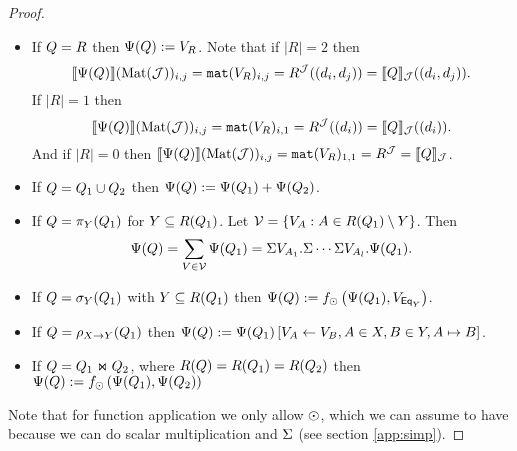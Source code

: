 \begin{proof}
\begin{itemize}
  \item If $Q = R$ then $\Psi (Q):=V_R$. Note that if $|R|=2$ then 
    $$\llbracket \Psi(Q) \rrbracket(\text{Mat}(\mathcal{J}))_{i,j}=\texttt{mat}(V_R)_{i,j} = R^{\mathcal{J}}((d_i, d_j))=\llbracket Q \rrbracket_{\mathcal{J}}((d_i, d_j)).$$ 
    If $|R|=1$ then 
    $$\llbracket \Psi(Q) \rrbracket(\text{Mat}(\mathcal{J}))_{i,j}=\texttt{mat}(V_R)_{i,1} = R^{\mathcal{J}}((d_i))=\llbracket Q \rrbracket_{\mathcal{J}}((d_i)).$$
    And if $|R|=0$ then 
    $\llbracket \Psi(Q) \rrbracket(\text{Mat}(\mathcal{J}))_{i,j}=\texttt{mat}(V_R)_{1,1} = R^{\mathcal{J}}=\llbracket Q \rrbracket_{\mathcal{J}}$.
  \item If $Q=Q_1\cup Q_2$ then $\Psi(Q):=\Psi(Q_1)+\Psi(Q_2)$.
  \item If $Q = \pi_{Y}(Q_1)$ for $Y\subseteq R(Q_1)$. Let $\mathcal{V} = \lbrace V_A:A\in R(Q_1)\setminus Y \rbrace$. 
    Then
    $$
    \Psi(Q) = \sum_{V\in\mathcal{V}} \Psi(Q_1) = \Sigma V_{A_1}. \Sigma \cdots \Sigma V_{A_{l}}. \Psi(Q_1).
    $$
  \item If $Q = \sigma_Y(Q_1)$ with $Y\subseteq R(Q_1)$ then 
    $\Psi(Q):=f_{\odot}\left( \Psi(Q_1), V_{\mathsf{Eq}_Y} \right)$.
  \item If $Q = \rho_{X\rightarrow Y}(Q_1)$ then $\Psi (Q):= \Psi (Q_1)\left[ V_A\gets V_B, A\in X, B\in Y, A \mapsto B \right]$.
  \item If $Q = Q_1\Join Q_2$, where $R(Q)=R(Q_1)=R(Q_2)$ then 
    $\Psi (Q):=f_{\odot}\left( \Psi (Q_1), \Psi (Q_2) \right)$
\end{itemize}

Note that for function application we only allow $\odot$, 
which we can assume to have because we can do scalar multiplication and $\Sigma$ (see section \ref{app:simp}).

\end{proof}
